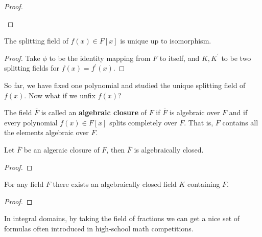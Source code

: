 \begin{proof}
    \begin{figure}[H]
      \centering 
    \end{figure}
  \end{proof}

  \begin{corollary}
    The splitting field of $f(x) \in F[x]$ is unique up to isomorphism. 
  \end{corollary}
  \begin{proof}
    Take $\phi$ to be the identity mapping from $F$ to itself, and $K, K^\prime$ to be two splitting fields for $f(x) = f^\prime (x)$. 
  \end{proof}

  So far, we have fixed one polynomial and studied the unique splitting field of $f(x)$. Now what if we unfix $f(x)$? 

  \begin{definition}
    The field $\overline{F}$ is called an \textbf{algebraic closure} of $F$ if $\overline{F}$ is algebraic over $F$ and if every polynomial $f(x) \in F[x]$ splits completely over $\overline{F}$. That is, $\overline{F}$ contains all the elements algebraic over $F$. 
  \end{definition}

  \begin{lemma}
    Let $\overline{F}$ be an algeraic closure of $F$, then $\overline{F}$ is algebraically closed. 
  \end{lemma}
  \begin{proof}
    
  \end{proof}

  \begin{theorem}
    For any field $F$ there exists an algebraically closed field $K$ containing $F$.
  \end{theorem}
  \begin{proof}
    
  \end{proof}

  In integral domains, by taking the field of fractions we can get a nice set of formulas often introduced in high-school math competitions. 

